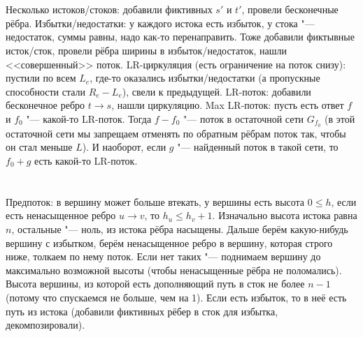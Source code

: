 \section{} %
Несколько истоков/стоков: добавили фиктивных $s'$ и $t'$, провели бесконечные рёбра.
Избытки/недостатки: у каждого истока есть избыток, у стока "--- недостаток, суммы равны, надо как-то перенаправить.
Тоже добавили фиктывные исток/сток, провели рёбра ширины в избыток/недостаток, нашли <<совершенный>> поток.
LR-циркуляция (есть ограничение на поток снизу): пустили по всем $L_e$, где-то оказались избытки/недостатки (а пропускные способности стали $R_e-L_e$), свели к предыдущей.
LR-поток: добавили бесконечное ребро $t \to s$, нашли циркуляцию.
Max LR-поток: пусть есть ответ $f$ и $f_0$ "--- какой-то LR-поток.
Тогда $f-f_0$ "--- поток в остаточной сети $G_{f_0}$ (в этой остаточной сети мы запрещаем отменять по обратным рёбрам поток так, чтобы он стал меньше $L$).
И наоборот, если $g$ "--- найденный поток в такой сети, то $f_0+g$ есть какой-то LR-поток.

\section{} %
Предпоток: в вершину может больше втекать, у вершины есть высота $0 \le h$, если есть ненасыщенное ребро $u \to v$, то $h_u \le h_v + 1$.
Изначально высота истока равна $n$, остальные "--- ноль, из истока рёбра насыщены.
Дальше берём какую-нибудь вершину с избытком, берём ненасыщенное ребро в вершину, которая строго ниже, толкаем по нему поток.
Если нет таких "--- поднимаем вершину до максимально возможной высоты (чтобы ненасыщенные рёбра не поломались).
Высота вершины, из которой есть дополняющий путь в сток не более $n-1$ (потому что спускаемся не больше, чем на 1).
Если есть избыток, то в неё есть путь из истока (добавили фиктивных рёбер в сток для избытка, декомпозировали).
\TODO

\section{} %
\TODO

\section{} %
\TODO

\section{} %
\TODO

\section{} %
\TODO

\section{} %
\TODO

\section{} %
\TODO
